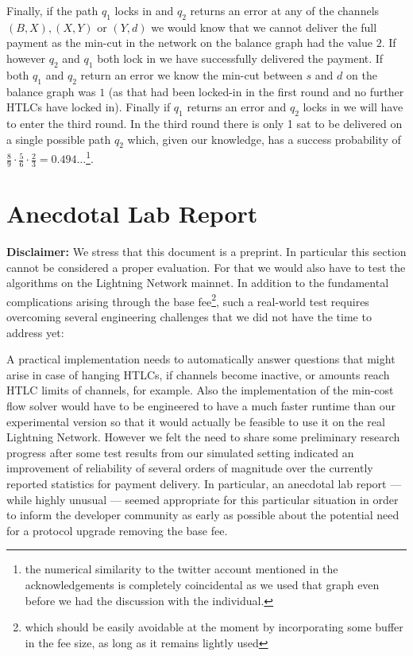 \documentclass[10pt,twocolumn]{article}
\begin{document}
Finally, if the path $q_1$ locks in and $q_2$ returns an error at any of the channels $(B,X),(X,Y)$ or $(Y,d)$ we would know that we cannot deliver the full payment as the min-cut in the network on the balance graph had the value $2$.
If however $q_2$ and $q_1$ both lock in we have successfully delivered the payment.
If both $q_1$ and $q_2$ return an error we know the min-cut between $s$ and $d$ on the balance graph was $1$ (as that had been locked-in in the first round and no further HTLCs have locked in).
Finally if $q_1$ returns an error and $q_2$ locks in we will have to enter the third round.
In the third round there is only 1 sat to be delivered on a single possible path $q_2$ which, given our knowledge, has a success probability of $\frac{8}{9}\cdot\frac{5}{6}\cdot\frac{2}{3}=0.494\ldots$\footnote{the numerical similarity to the twitter account mentioned in the acknowledgements is completely coincidental as we used that graph even before we had the discussion with the individual.}.


\section{Anecdotal Lab Report}
\textbf{Disclaimer:} We stress that this document is a preprint. In particular this section cannot be considered a proper evaluation. For that we would also have to test the algorithms on the Lightning Network mainnet.
In addition to the fundamental complications arising through the base fee\footnote{which should be easily avoidable at the moment by incorporating some buffer in the fee size, as long as it remains lightly used}, such a real-world test requires overcoming several engineering challenges that we did not have the time to address yet:

A practical implementation needs to automatically answer questions that might arise in case of hanging HTLCs, if channels become inactive, or amounts reach HTLC limits of channels, for example.
Also the implementation of the min-cost flow solver would have to be engineered to have a much faster runtime than our experimental version so that it would actually be feasible to use it on the real Lightning Network.
However we felt the need to share some preliminary research progress after some test results from our simulated setting indicated an improvement of reliability of several orders of magnitude over the currently reported statistics for payment delivery.
In particular, an anecdotal lab report --- while highly unusual --- seemed appropriate for this particular situation in order to inform the developer community as early as possible about the potential need for a protocol upgrade removing the base fee.
\end{document}
